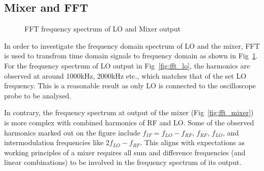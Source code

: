\documentclass[a4paper,12pt]{article}
\begin{document}
\subsection{Mixer and FFT}

\vspace{-1.5em}
\begin{figure}[H]
    \centering
    \hspace{0pt}  %
    \caption{FFT frequency spectrum of LO and Mixer output}
    \label{fig:fft_1}
\end{figure}

In order to investigate the frequency domain spectrum of LO and the mixer, FFT is used to transfrom time domain signals to frequency domain as shown in Fig~\ref{fig:fft_1}.
For the frequency spectrum of LO output in Fig~\ref{fig:fft_lo}, the harmonics are observed at around 1000kHz, 2000kHz etc., which matches that of the set LO frequency. This is a reasonable result as only LO is connected to the oscilloscope probe to be analysed.

In contrary, the frequency spectrum at output of the mixer (Fig~\ref{fig:fft_mixer}) is more complex with combined harmonics of RF and LO. Some of the observed harmonics marked out on the figure include $f_{IF}=f_{LO}-f_{RF}$, $f_{RF}$, $f_{LO}$, and intermodulation frequencies like $2f_{LO}-f_{RF}$. 
This aligns with expectations as working principles of a mixer requires all sum and difference frequencies (and linear combinations) to be involved in the frequency spectrum of its output.
\end{document}
